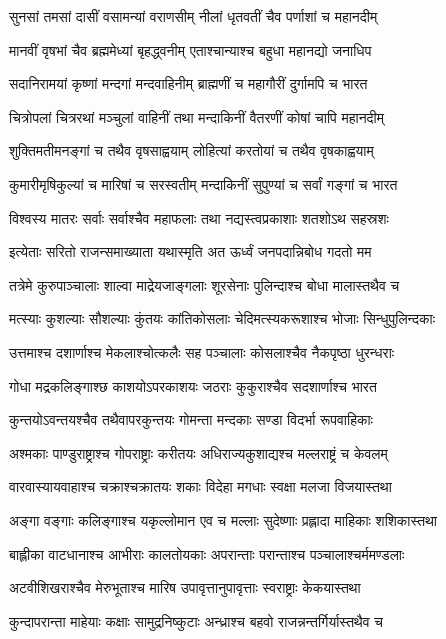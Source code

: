 \twolineshloka
{सुनसां तमसां दासीं वसामन्यां वराणसीम्}
{नीलां धृतवतीं चैव पर्णाशां च महानदीम्}


\twolineshloka
{मानवीं वृषभां चैव ब्रह्ममेध्यां बृहद्ध्वनीम्}
{एताश्चान्याश्च बहुधा महानद्यो जनाधिप}


\twolineshloka
{सदानिरामयां कृष्णां मन्दगां मन्दवाहिनीम्}
{ब्राह्मणीं च महागौरीं दुर्गामपि च भारत}


\twolineshloka
{चित्रोपलां चित्ररथां मञ्चुलां वाहिनीं तथा}
{मन्दाकिनीं वैतरणीं कोषां चापि महानदीम्}


\twolineshloka
{शुक्तिमतीमनङ्गां च तथैव वृषसाह्वयाम्}
{लोहित्यां करतोयां च तथैव वृषकाह्वयाम्}


\twolineshloka
{कुमारीमृषिकुल्यां च मारिषां च सरस्वतीम्}
{मन्दाकिनीं सुपुण्यां च सर्वां गङ्गां च भारत}


\twolineshloka
{विश्वस्य मातरः सर्वाः सर्वाश्चैव महाफलाः}
{तथा नद्यस्त्वप्रकाशाः शतशोऽथ सहस्रशः}


\twolineshloka
{इत्येताः सरितो राजन्समाख्याता यथास्मृति}
{अत ऊर्ध्वं जनपदान्निबोध गदतो मम}


\twolineshloka
{तत्रेमे कुरुपाञ्चालाः शाल्वा माद्रेयजाङ्गलाः}
{शूरसेनाः पुलिन्दाश्च बोधा मालास्तथैव च}


\twolineshloka
{मत्स्याः कुशल्याः सौशल्याः कुंतयः कांतिकोसलाः}
{चेदिमत्स्यकरूशाश्च भोजाः सिन्धुपुलिन्दकाः}


\twolineshloka
{उत्तमाश्च दशार्णाश्च मेकलाश्चोत्कलैः सह}
{पञ्चालाः कोसलाश्चैव नैकपृष्ठा धुरन्धराः}


\twolineshloka
{गोधा मद्रकलिङ्गाश्छ काशयोऽपरकाशयः}
{जठराः कुकुराश्चैव सदशार्णाश्च भारत}


\twolineshloka
{कुन्तयोऽवन्तयश्चैव तथैवापरकुन्तयः}
{गोमन्ता मन्दकाः सण्डा विदर्भा रूपवाहिकाः}


\twolineshloka
{अश्मकाः पाण्डुराष्ट्राश्च गोपराष्ट्राः करीतयः}
{अधिराज्यकुशाद्यश्च मल्लराष्ट्रं च केवलम्}


\twolineshloka
{वारवास्यायवाहाश्च चक्राश्चक्रातयः शकाः}
{विदेहा मगधाः स्वक्षा मलजा विजयास्तथा}


\twolineshloka
{अङ्गा वङ्गाः कलिङ्गाश्च यकृल्लोमान एव च}
{मल्लाः सुदेष्णाः प्रह्लादा माहिकाः शशिकास्तथा}


\twolineshloka
{बाह्लीका वाटधानाश्च आभीराः कालतोयकाः}
{अपरान्ताः परान्ताश्च पञ्चालाश्चर्ममण्डलाः}


\twolineshloka
{अटवीशिखराश्चैव मेरुभूताश्च मारिष}
{उपावृत्तानुपावृत्ताः स्वराष्ट्राः केकयास्तथा}


\twolineshloka
{कुन्दापरान्ता माहेयाः कक्षाः सामुद्रनिष्कुटाः}
{अन्ध्राश्च बहवो राजन्नन्तर्गिर्यास्तथैव च}


